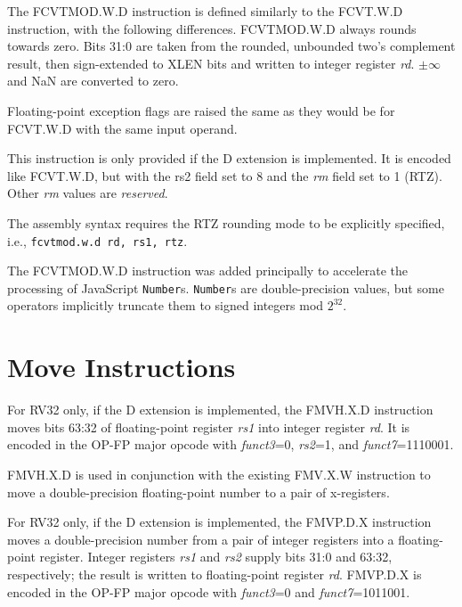 The FCVTMOD.W.D instruction is defined similarly to the FCVT.W.D
instruction, with the following differences.
FCVTMOD.W.D always rounds towards zero.
Bits 31:0 are taken from the rounded, unbounded two's complement result,
then sign-extended to XLEN bits and written to integer register {\em rd}.
$\pm\infty$ and NaN are converted to zero.

Floating-point exception flags are raised the same as they would be for
FCVT.W.D with the same input operand.

This instruction is only provided if the D extension is implemented.
It is encoded like FCVT.W.D, but with the {\rm rs2} field set to 8
and the {\em rm} field set to 1 (RTZ).
Other {\em rm} values are {\em reserved}.

\begin{commentary}
The assembly syntax requires the RTZ rounding mode to be explicitly
specified, i.e., {\tt fcvtmod.w.d rd, rs1, rtz}.
\end{commentary}

\begin{commentary}
The FCVTMOD.W.D instruction was added principally to accelerate the
processing of JavaScript {\tt Number}s.
{\tt Number}s are double-precision values, but some operators implicitly
truncate them to signed integers mod $2^{32}$.
\end{commentary}


\section{Move Instructions}

For RV32 only, if the D extension is implemented,
the FMVH.X.D instruction moves bits 63:32 of floating-point register {\em rs1}
into integer register {\em rd}.
It is encoded in the OP-FP major opcode with {\em funct3}=0, {\em rs2}=1,
and {\em funct7}=1110001.

\begin{commentary}
FMVH.X.D is used in conjunction with the existing FMV.X.W instruction to move
a double-precision floating-point number to a pair of x-registers.
\end{commentary}

For RV32 only, if the D extension is implemented,
the FMVP.D.X instruction moves a double-precision number from a pair of integer
registers into a floating-point register.  Integer registers {\em rs1} and
{\em rs2} supply bits 31:0 and 63:32, respectively; the result is written to
floating-point register {\em rd}.
FMVP.D.X is encoded in the OP-FP major opcode with {\em funct3}=0
and {\em funct7}=1011001.

